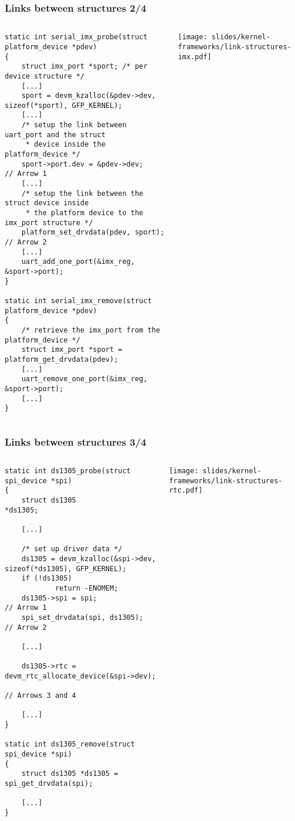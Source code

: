 \begin{frame}[fragile]
  \frametitle{Links between structures 2/4}
  \begin{columns}
    \begin{verbatim}
static int serial_imx_probe(struct platform_device *pdev)
{
    struct imx_port *sport; /* per device structure */
    [...]
    sport = devm_kzalloc(&pdev->dev, sizeof(*sport), GFP_KERNEL);
    [...]
    /* setup the link between uart_port and the struct
     * device inside the platform_device */
    sport->port.dev = &pdev->dev;                                // Arrow 1
    [...]
    /* setup the link between the struct device inside
     * the platform device to the imx_port structure */
    platform_set_drvdata(pdev, sport);                           // Arrow 2
    [...]
    uart_add_one_port(&imx_reg, &sport->port);
}

static int serial_imx_remove(struct platform_device *pdev)
{
    /* retrieve the imx_port from the platform_device */
    struct imx_port *sport = platform_get_drvdata(pdev);
    [...]
    uart_remove_one_port(&imx_reg, &sport->port);
    [...]
}
    \end{verbatim}
    \begin{center}
      \texttt{[image: slides/kernel-frameworks/link-structures-imx.pdf]}
    \end{center}
  \end{columns}
\end{frame}

\begin{frame}[fragile]
  \frametitle{Links between structures 3/4}
  \begin{columns}
    \begin{verbatim}
static int ds1305_probe(struct spi_device *spi)
{
    struct ds1305                   *ds1305;

    [...]

    /* set up driver data */
    ds1305 = devm_kzalloc(&spi->dev, sizeof(*ds1305), GFP_KERNEL);
    if (!ds1305)
            return -ENOMEM;
    ds1305->spi = spi;                         // Arrow 1
    spi_set_drvdata(spi, ds1305);              // Arrow 2

    [...]

    ds1305->rtc = devm_rtc_allocate_device(&spi->dev); 
                                               // Arrows 3 and 4

    [...]
}

static int ds1305_remove(struct spi_device *spi)
{
    struct ds1305 *ds1305 = spi_get_drvdata(spi);

    [...]
}
    \end{verbatim}
    \begin{center}
      \texttt{[image: slides/kernel-frameworks/link-structures-rtc.pdf]}
    \end{center}
  \end{columns}
\end{frame}

